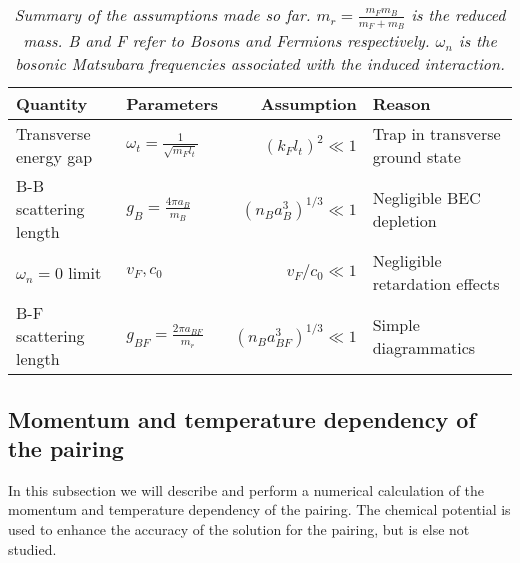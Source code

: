 \begin{table}[htb]
\def\arraystretch{1.3}
\centering
\caption{\textit{Summary of the assumptions made so far. $m_r = \frac{m_Fm_B}{m_F+m_B}$ is the reduced mass. B and F refer to Bosons and Fermions respectively. $\omega_n$ is the bosonic Matsubara frequencies associated with the induced interaction.}}
\begin{tabular}{|l|l|r|l|}
\hline \textbf{Quantity} & \textbf{Parameters} 						& \textbf{Assumption}						& \textbf{Reason}	\\
\hline Transverse energy gap & $\omega_t = \frac{1}{\sqrt{m_Fl_t}}$ & $(k_Fl_t)^2 	 	\ll 1$ 					& Trap in transverse ground state \\
\hline B-B scattering length & $g_B = \frac{4\pi a_B}{m_B}$			& $(n_Ba_B^3)^{1/3}	\ll 1$					& Negligible BEC depletion  \\
\hline $\omega_n = 0$ limit  & $v_F,c_0$							& $v_F/c_0 \ll 1$ & Negligible retardation effects  \\
\hline B-F scattering length & $g_{BF} = \frac{2\pi a_{BF}}{m_r}$ 	& $(n_Ba_{BF}^3)^{1/3}	\ll 1$				& Simple diagrammatics\\
\hline 
\end{tabular}
\label{tab.assumptions}
\end{table}

\subsection{Momentum and temperature dependency of the pairing}
\label{subsec.momentum_and_temperature_pairing_singlewire}
In this subsection we will describe and perform a numerical calculation of the momentum and temperature dependency of the pairing. The chemical potential is used to enhance the accuracy of the solution for the pairing, but is else not studied. 

